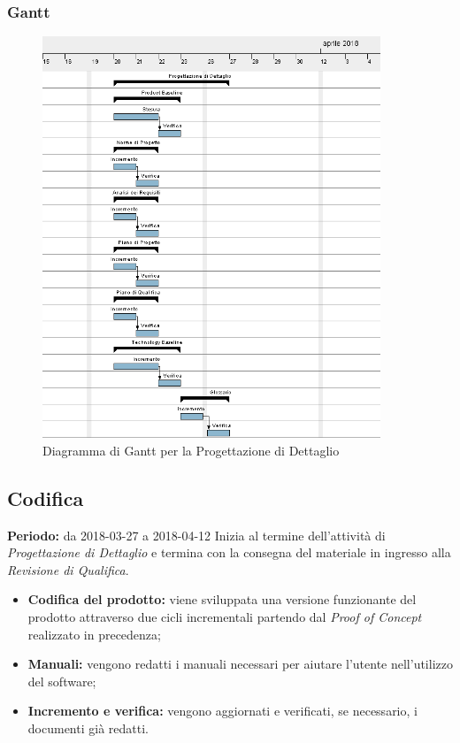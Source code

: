 \subsubsection{Gantt}
\begin{figure}[H]
	\centering 
	\includegraphics[width=0.9\textwidth]{images/Progettazione-Dettaglio.png}
	\caption{Diagramma di Gantt per la Progettazione di Dettaglio}
	\label{graficobello4} 
\end{figure}
\subsection{Codifica}
    \textbf{Periodo:} da 2018-03-27 a 2018-04-12\Spazio
    Inizia al termine dell'attività di \emph{Progettazione di Dettaglio} e termina con la consegna del materiale in ingresso alla \emph{Revisione di Qualifica}.
    \begin{itemize}
    	\item \textbf{Codifica del prodotto:} viene sviluppata una versione funzionante del prodotto attraverso due cicli incrementali partendo dal \textit{Proof of Concept} realizzato in precedenza;
    	\item \textbf{Manuali:} vengono redatti i manuali necessari per aiutare l'utente nell'utilizzo del software;
    	\item \textbf{Incremento e verifica:} vengono aggiornati e verificati, se necessario, i documenti già redatti.
    \end{itemize}
